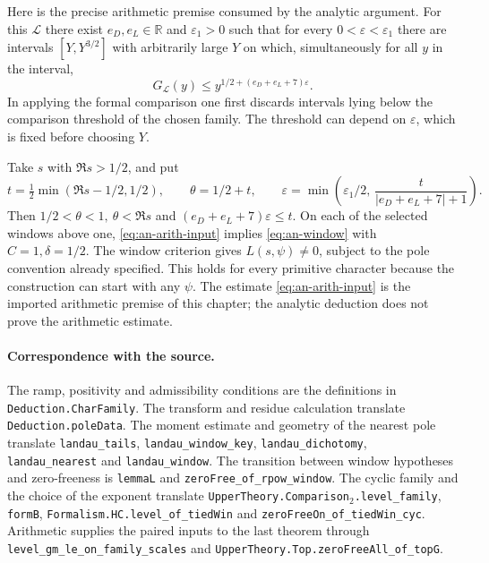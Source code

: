 Here is the precise arithmetic premise consumed by the analytic argument.
For this \(\mathcal L\) there exist \(e_D,e_L\in\mathbb R\) and
\(\varepsilon_1>0\) such that for every \(0<\varepsilon<\varepsilon_1\)
there are intervals \([Y,Y^{3/2}]\) with arbitrarily large \(Y\) on
which, simultaneously for all \(y\) in the interval,
\begin{equation}
 G_{\mathcal L}(y)\leq y^{1/2+(e_D+e_L+7)\varepsilon}.
 \label{eq:an-arith-input}
\end{equation}
In applying the formal comparison one first discards intervals lying
below the comparison threshold of the chosen family. The threshold
can depend on \(\varepsilon\), which is fixed before choosing \(Y\).

Take \(s\) with \(\Re s>1/2\), and put
\[
 t=\tfrac12\min(\Re s-1/2,1/2),\qquad
 \theta=1/2+t,\qquad
 \varepsilon=\min\!\left(\varepsilon_1/2,\,
                     \frac{t}{|e_D+e_L+7|+1}\right).
\]
Then \(1/2<\theta<1,\ \theta<\Re s\) and
\((e_D+e_L+7)\varepsilon\leq t\). On each of the selected windows
above one, \eqref{eq:an-arith-input} implies \eqref{eq:an-window} with
\(C=1,\delta=1/2\). The window criterion gives \(L(s,\psi)\ne0\),
subject to the pole convention already specified. This holds for
every primitive character because the construction can start with
any \(\psi\). The estimate \eqref{eq:an-arith-input} is the imported
arithmetic premise of this chapter; the analytic deduction does not
prove the arithmetic estimate.

\paragraph{Correspondence with the source.}
The ramp, positivity and admissibility conditions are the definitions
in \texttt{Deduction.\allowbreak{}Char\allowbreak{}Family}. The transform and residue calculation
translate \texttt{Deduction.\allowbreak{}pole\allowbreak{}Data}. The moment estimate and geometry
of the nearest pole translate \texttt{landau\_\allowbreak{}tails},
\texttt{landau\_\allowbreak{}window\_\allowbreak{}key}, \texttt{landau\_\allowbreak{}dichotomy},
\texttt{landau\_\allowbreak{}nearest} and \texttt{landau\_\allowbreak{}window}. The transition
between window hypotheses and zero-freeness is \texttt{lemma\allowbreak{}L} and
\texttt{zero\allowbreak{}Free\_\allowbreak{}of\_\allowbreak{}rpow\_\allowbreak{}window}. The cyclic family and the choice of
the exponent translate \texttt{Upper\allowbreak{}Theory.\allowbreak{}Comparison\ensuremath{{}_2}.\allowbreak{}level\_\allowbreak{}family},
\texttt{form\allowbreak{}B}, \texttt{Formalism.\allowbreak{}HC.\allowbreak{}level\_\allowbreak{}of\_\allowbreak{}tied\allowbreak{}Win} and
\texttt{zero\allowbreak{}Free\allowbreak{}On\_\allowbreak{}of\_\allowbreak{}tied\allowbreak{}Win\_\allowbreak{}cyc}. Arithmetic supplies the paired
inputs to the last theorem through \texttt{level\_\allowbreak{}gm\_\allowbreak{}le\_\allowbreak{}on\_\allowbreak{}family\_\allowbreak{}scales}
and \texttt{Upper\allowbreak{}Theory.\allowbreak{}Top.\allowbreak{}zero\allowbreak{}Free\allowbreak{}All\_\allowbreak{}of\_\allowbreak{}top\allowbreak{}G}.
